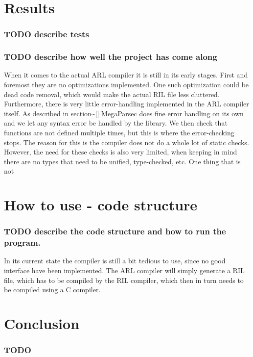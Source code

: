 \documentclass[a4paper]{article}
\begin{document}
\section{Results}
\label{sec:org3285223}
\subsubsection{{\bfseries\sffamily TODO} describe tests}
\label{sec:org22d23b9}
\subsubsection{{\bfseries\sffamily TODO} describe how well the project has come along}
\label{sec:orgf726c34}
When it comes to the actual ARL compiler it is still in its early stages. First and foremost they are no optimizations implemented. One such optimization could be dead code removal, which would make the actual RIL file less cluttered. Furthermore, there is very little error-handling implemented in the ARL compiler itself. As described in section\textasciitilde{}\ref{} MegaParsec does fine error handling on its own and we let any syntax error be handled by the library. We then check that functions are not defined multiple times, but this is where the error-checking stops. The reason for this is the compiler does not do a whole lot of static checks. However, the need for these checks is also very limited, when keeping in mind there are no types that need to be unified, type-checked, etc. One thing that is not
\section{How to use - code structure}
\label{sec:org6c3ec0d}
\subsubsection{{\bfseries\sffamily TODO} describe the code structure and how to run the program.}
\label{sec:org9b415c1}
In its current state the compiler is still a bit tedious to use, since no good interface have been implemented. The ARL compiler will simply generate a RIL file, which has to be compiled by the RIL compiler, which then in turn needs to be compiled using a C compiler.
\section{Conclusion}
\label{sec:orgf350639}
\subsubsection{TODO}
\label{sec:org0b73c81}
\end{document}
